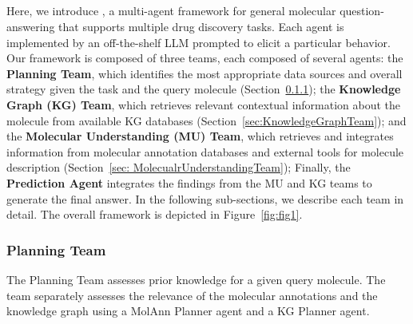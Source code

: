 

\subsection{\proposed}

Here, we introduce \proposed, a multi-agent framework for general molecular question-answering that supports multiple drug discovery tasks. Each agent is implemented by an off-the-shelf LLM prompted to elicit a particular behavior.
Our framework is composed of three teams, each composed of several agents: 
the \textbf{Planning Team}, which identifies the most appropriate data sources and overall strategy given the task and the query molecule (Section~\ref{sec: Planning Team}); 
the \textbf{Knowledge Graph (KG) Team}, which retrieves relevant contextual information about the molecule from available KG databases (Section~\ref{sec:KnowledgeGraphTeam});
and the \textbf{Molecular Understanding (MU) Team}, which retrieves and integrates information from molecular annotation databases and external tools for molecule description (Section~\ref{sec: MolecualrUnderstandingTeam}); 
Finally, the \textbf{Prediction Agent}  integrates the findings from the MU and KG teams to generate the final answer.
In the following sub-sections, we describe each team in detail. The overall framework is depicted in Figure~\ref{fig:fig1}.

\subsubsection{Planning Team}
\label{sec: Planning Team}

The Planning Team assesses prior knowledge for a given query molecule. The team separately assesses the relevance of the molecular annotations and the knowledge graph using a MolAnn Planner agent and a KG Planner agent. 


